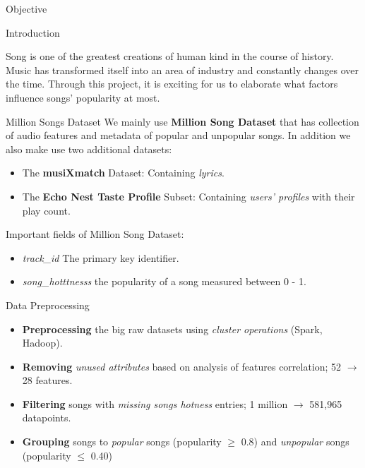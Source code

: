 \documentclass[final]{beamer}
\newlength{\onecolwid}
\begin{document}
\begin{frame}
\begin{columns}[t]
\begin{column}{\onecolwid}
\begin{exampleblock}{Objective}
\end{exampleblock}


\begin{exampleblock}{Introduction}

Song is one of the greatest creations of human kind in the course of history. Music has transformed itself into an area of industry and constantly changes over the time. Through this project, it is exciting for us to elaborate what factors influence songs' popularity at most.
\end{exampleblock}

\begin{exampleblock}{Million Songs Dataset}
We mainly use \textbf{Million Song Dataset} that has collection of audio features and metadata of popular and unpopular songs. In addition we also make use two additional datasets:
\begin{itemize}
\item The \textbf{musiXmatch} Dataset: Containing \textit{lyrics}.
\item The \textbf{Echo Nest Taste Profile} Subset: Containing \textit{users' profiles} with their play count.
\end{itemize}

Important fields of Million Song Dataset:
\begin{itemize}
\item \textit{track\_id}
The primary key identifier.
\item \textit{song\_hotttnesss} the popularity of a song measured between 0 - 1.
\end{itemize}
\end{exampleblock}

\begin{exampleblock}{Data Preprocessing}

\begin{itemize}
\item \textbf{Preprocessing} the big raw datasets using \textit{cluster operations} (Spark, Hadoop).
\item \textbf{Removing} \textit{unused attributes} based on analysis of features correlation; 52 $\rightarrow$ 28 features.
\item \textbf{Filtering} songs with \textit{missing songs hotness} entries; 1 million $\rightarrow$ 581,965 datapoints.
\item \textbf{Grouping} songs to \textit{popular} songs (popularity $\geq$ 0.8) and \textit{unpopular} songs (popularity $\leq$ 0.40)
\end{itemize}


\end{exampleblock}
\end{column}
\end{columns}
\end{frame}
\end{document}
